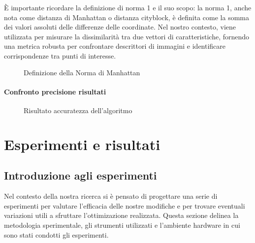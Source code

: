 \documentclass[12pt,a4paper]{report}
\begin{document}
\vspace{1cm}

È importante ricordare la definizione di norma 1 e il suo scopo: la norma 1, anche nota come distanza di Manhattan o distanza cityblock, è definita come la somma dei valori assoluti delle differenze delle coordinate. Nel nostro contesto, viene utilizzata per misurare la dissimilarità tra due vettori di caratteristiche, fornendo una metrica robusta per confrontare descrittori di immagini e identificare corrispondenze tra punti di interesse.

\begin{figure}[h]
    \centering
    \caption{Definizione della Norma di Manhattan}
\end{figure}

\subsubsection{Confronto precisione risultati}

\begin{figure}[h]
    \centering
    \caption{Risultato accuratezza dell'algoritmo}
\end{figure}

\chapter{Esperimenti e risultati}

\section{Introduzione agli esperimenti}

Nel contesto della nostra ricerca si è pensato di progettare una serie di esperimenti per valutare l'efficacia delle nostre modifiche e per trovare eventuali variazioni utili a sfruttare l'ottimizazione realizzata. Questa sezione delinea la metodologia sperimentale, gli strumenti utilizzati e l'ambiente hardware in cui sono stati condotti gli esperimenti.
\end{document}
